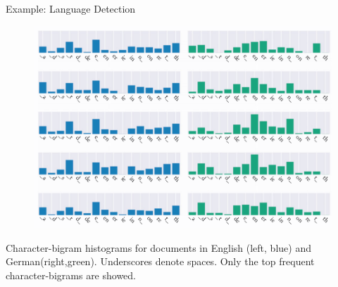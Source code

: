 \documentclass[handout]{beamer}
\begin{document}
\begin{frame}{Example: Language Detection}


\begin{figure}[htb]
	\centering
	 \includegraphics[scale=0.27]{pics/langbigrams.png}
\end{figure}

\scriptsize{Character-bigram histograms for documents in English (left, blue) and German(right,green). Underscores denote spaces. Only the top frequent character-bigrams are showed.}


\end{frame}
\end{document}
